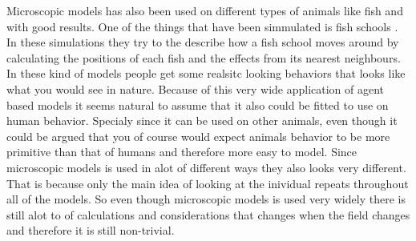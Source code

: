 Microscopic models has also been used on different types of animals like fish 
and with good results.  One of the things that have been simmulated is fish 
schools \cite{fish}. In these simulations they try to the describe how a fish 
school moves around by calculating the positions of each fish and the effects 
from its nearest neighbours. In these kind of models people get some realsitc 
looking behaviors that looks like what you would see in nature. Because of 
this very wide application of agent based models it seems natural to assume 
that it also could be fitted to use on human behavior. Specialy since it can 
be used on other animals, even though it could be argued that you of course 
would expect animals behavior to be more primitive than that of humans and 
therefore more easy to model.  Since microscopic models is used in alot of 
different ways they also looks very different. That is because only the main 
idea of looking at the inividual repeats throughout all of the models. So even 
though microscopic models is used very widely there is still alot to of 
calculations and considerations that changes when the field changes and 
therefore it is still non-trivial.


